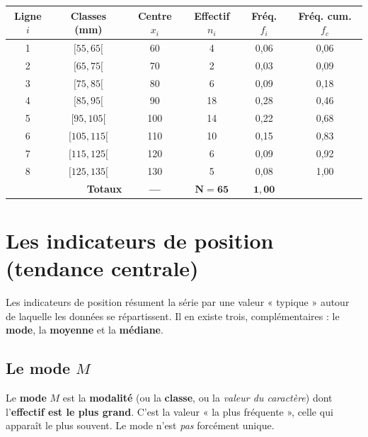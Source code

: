 \documentclass[11pt,a4paper]{article}
\begin{document}
\begin{center}
\renewcommand{\arraystretch}{1.2}
\begin{tabular}{|c|c|c|c|c|c|}
\hline
\rowcolor{primary!18}
\textbf{Ligne $i$} & \textbf{Classes (mm)} & \textbf{Centre $x_i$} & \textbf{Effectif $n_i$} & \textbf{Fréq. $f_i$} & \textbf{Fréq. cum. $f_c$} \\
\hline
1 & $[55,65[$  & 60  & 4  & 0{,}06 & 0{,}06 \\
2 & $[65,75[$  & 70  & 2  & 0{,}03 & 0{,}09 \\
3 & $[75,85[$  & 80  & 6  & 0{,}09 & 0{,}18 \\
4 & $[85,95[$  & 90  & 18 & 0{,}28 & 0{,}46 \\
5 & $[95,105[$ & 100 & 14 & 0{,}22 & 0{,}68 \\
6 & $[105,115[$& 110 & 10 & 0{,}15 & 0{,}83 \\
7 & $[115,125[$& 120 & 6  & 0{,}09 & 0{,}92 \\
8 & $[125,135[$& 130 & 5  & 0{,}08 & 1{,}00 \\
\hline
\multicolumn{2}{|r|}{\textbf{Totaux}} & \textbf{—} & $\boldsymbol{N=65}$ & $\boldsymbol{1{,}00}$ & \\
\hline
\end{tabular}
\end{center}

\section{Les indicateurs de position (tendance centrale)}
Les indicateurs de position résument la série par une valeur « typique » autour de laquelle les
données se répartissent. Il en existe trois, complémentaires : le \textbf{mode}, la \textbf{moyenne}
et la \textbf{médiane}.

\subsection{Le mode $M$}

\begin{definition}[mode]
Le \textbf{mode} $M$ est la \textbf{modalité} (ou la \textbf{classe}, ou la \emph{valeur du
caractère}) dont l'\textbf{effectif est le plus grand}. C'est la valeur « la plus fréquente »,
celle qui apparaît le plus souvent. Le mode n'est \emph{pas} forcément unique.
\end{definition}
\end{document}
